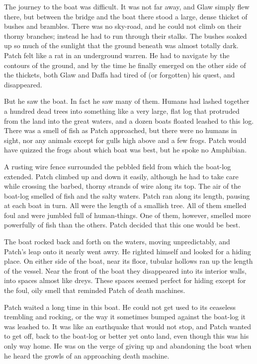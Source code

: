 \documentclass[12pt]{book}
\begin{document}
 The journey to the boat was difficult. It was not far away, and Glaw simply flew there, but between the bridge and the boat there stood a large, dense thicket of bushes and brambles. There was no sky-road, and he could not climb on their thorny branches; instead he had to run through their stalks. The bushes soaked up so much of the sunlight that the ground beneath was almost totally dark. Patch felt like a rat in an underground warren. He had to navigate by the contours of the ground, and by the time he finally emerged on the other side of the thickets, both Glaw and Daffa had tired of (or forgotten) his quest, and disappeared.\par
 But he saw the boat. In fact he saw many of them. Humans had lashed together a hundred dead trees into something like a very large, flat log that protruded from the land into the great waters, and a dozen boats floated leashed to this log. There was a smell of fish as Patch approached, but there were no humans in sight, nor any animals except for gulls high above and a few frogs. Patch would have quizzed the frogs about which boat was best, but he spoke no Amphibian.\par
 A rusting wire fence surrounded the pebbled field from which the boat-log extended. Patch climbed up and down it easily, although he had to take care while crossing the barbed, thorny strands of wire along its top. The air of the boat-log smelled of fish and the salty waters. Patch ran along its length, pausing at each boat in turn. All were the length of a smallish tree. All of them smelled foul and were jumbled full of human-things. One of them, however, smelled more powerfully of fish than the others. Patch decided that this one would be best.\par
 The boat rocked back and forth on the waters, moving unpredictably, and Patch's leap onto it nearly went awry. He righted himself and looked for a hiding place. On either side of the boat, near its floor, tubular hollows ran up the length of the vessel. Near the front of the boat they disappeared into its interior walls, into spaces almost like dreys. These spaces seemed perfect for hiding %
 except for the foul, oily smell that reminded Patch of death machines.\par
 Patch waited a long time in this boat. He could not get used to its ceaseless trembling and rocking, or the way it sometimes bumped against the boat-log it was leashed to. It was like an earthquake that would not stop, and Patch wanted to get off, back to the boat-log or better yet onto land, even though this was his only way home. He was on the verge of giving up and abandoning the boat when he heard the growls of an approaching death machine.\par
\end{document}
